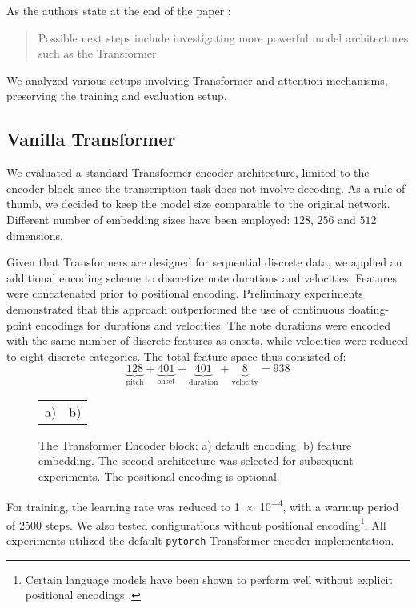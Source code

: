 As the authors state at the end of the paper \cite{Liu2022}: \begin{quote}Possible next steps include investigating more powerful model architectures such as the Transformer.\end{quote} We analyzed various setups involving Transformer and attention mechanisms, preserving the training and evaluation setup.

\subsection{Vanilla Transformer}

We evaluated a standard Transformer encoder architecture, limited to the encoder block since the transcription task does not involve decoding. As a rule of thumb, we decided to keep the model size comparable to the original network. Different number of embedding sizes have been employed: $128$, $256$ and $512$ dimensions. 

Given that Transformers are designed for sequential discrete data, we applied an additional encoding scheme to discretize note durations and velocities. Features were concatenated prior to positional encoding. Preliminary experiments demonstrated that this approach outperformed the use of continuous floating-point encodings for durations and velocities. The note durations were encoded with the same number of discrete features as onsets, while velocities were reduced to eight discrete categories. The total feature space thus consisted of: \[\underbrace{128}_{\textrm{pitch}}+\underbrace{401}_{\textrm{onset}}+\underbrace{401}_{\textrm{duration}}+\underbrace{8}_{\textrm{velocity}} = 938\]

\begin{figure}[ht!]
\centering
\begin{tabular}{cc}a)
 & b)

\end{tabular}
\caption[The Transformer Encoder block.]{The Transformer Encoder block: a) default encoding, b) feature embedding. The second architecture was selected for subsequent experiments. The positional encoding is optional.}
\label{vanilla_transformer_encoder_with_embedding}
\end{figure}

For training, the learning rate was reduced to \num{1e-4}, with a warmup period of 2500 steps. We also tested configurations without positional encoding\footnote{Certain language models have been shown to perform well without explicit positional encodings \cite{Haviv2022}.}. All experiments utilized the default \texttt{pytorch} Transformer encoder implementation.

